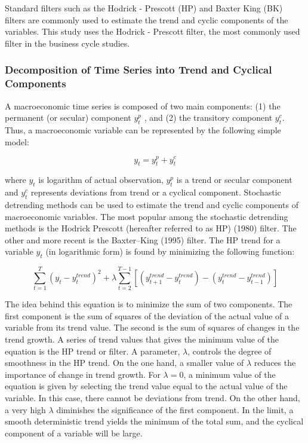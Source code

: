 \documentclass[12pt,a4paper,final]{article}
\begin{document}
Standard filters such as the Hodrick - Prescott (HP) and Baxter King (BK) filters are commonly used to estimate the trend and cyclic components of the variables.  This study uses the Hodrick - Prescott filter, the most commonly used filter in the business cycle studies.

\subsubsection*{Decomposition of Time Series into Trend and Cyclical Components}

A macroeconomic time series   is composed of two main components: (1) the permanent (or secular) component $y_t^p$ , and (2) the transitory component  $y_t^c$. Thus, a macroeconomic variable can be represented by the following simple model:

\[ y_t = y_t^p + y_t^c \]

where $y_t$  is logarithm of actual observation, $y_t^p$  is a trend or secular component and $y_t^c$  represents deviations from trend or a cyclical component.  Stochastic detrending methods can be used to estimate the trend and cyclic components of macroeconomic variables. The most popular among the stochastic detrending methods is the Hodrick Prescott  (hereafter referred to as HP) (1980) filter.  The other and more recent is the Baxter--King (1995) filter. The HP trend for a variable $y_t$ (in logarithmic form) is found by minimizing the following function:

\[ \sum_{t=1}^T\left( y_t - y_t^{trend}\right) ^2 + \lambda \sum_{t=2}^{T-1} \left[ \left( y_{t+1}^{trend} - y_t^{trend}\right) -\left( y_t^{trend} - y_{t-1}^{trend}\right)  \right] \]

The idea behind this equation is to minimize the sum of two components.  The first component is the sum of squares of the deviation of the actual value of a variable from its trend value.  The second is the sum of squares of changes in the trend growth.  A series of trend values that gives the minimum value of the equation is the HP trend or filter.
A parameter, $\lambda$, controls the degree of smoothness in the HP trend.  On the one hand, a smaller value of $\lambda$ reduces the importance of change in trend growth.  For $\lambda = 0$, a minimum value of the equation is given by selecting the trend value equal to the actual value of the variable.  In this case, there cannot be deviations from trend.  On the other hand, a very high $\lambda$ diminishes the significance of the first component.  In the limit, a smooth deterministic trend yields the minimum of the total sum, and the cyclical component of a variable will be large. 
\end{document}

